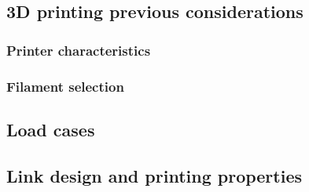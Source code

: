 \documentclass[../TFG_Report.tex]{subfiles}
\begin{document}
	
\subsection{3D printing previous considerations}

\subsubsection{Printer characteristics}\label{Section_printer_character}

\subsubsection{Filament selection}

\subsection{Load cases}

\subsection{Link design and printing properties}




	
\end{document}
